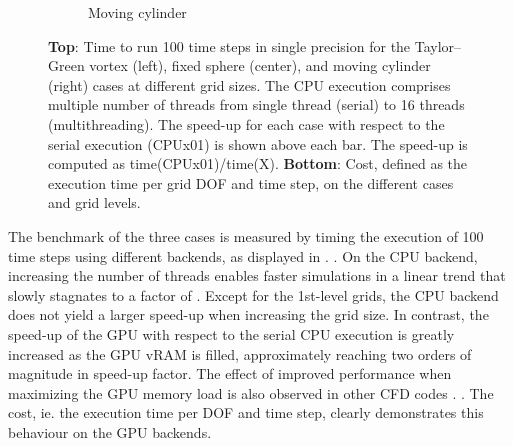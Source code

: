 \documentclass[10pt,a4paper]{article}
\begin{document}
\begin{figure}[!t]
\begin{subfigure}[t]{0.32\linewidth}
    \caption{Moving cylinder\hspace*{-1em}}
  \end{subfigure}
	\caption{\textbf{Top}: Time to run 100 time steps in single precision for the Taylor--Green vortex (left), fixed sphere (center), and moving cylinder (right) cases at different grid sizes. The CPU execution comprises multiple number of threads from single thread (serial) to 16 threads (multithreading). The speed-up for each case with respect to the serial execution (CPUx01) is shown above each bar. The speed-up is computed as time(CPUx01)/time(X). \textbf{Bottom}: Cost, defined as the execution time per grid DOF and time step, on the different cases and grid levels.}
	\label{fig:benchmarks}
\end{figure}

The benchmark of the three cases is measured by timing the execution of 100 time steps using different backends, as displayed in . . On the CPU backend, increasing the number of threads enables faster simulations in a linear trend that slowly stagnates to a factor of . Except for the 1st-level grids, the CPU backend does not yield a larger speed-up when increasing the grid size. In contrast, the speed-up of the GPU with respect to the serial CPU execution is greatly increased as the GPU vRAM is filled, approximately reaching two orders of magnitude in speed-up factor. The effect of improved performance when maximizing the GPU memory load is also observed in other CFD codes \citep{Kempf2024,Gasparino2024}. . The cost, ie. the execution time per DOF and time step, clearly demonstrates this behaviour on the GPU backends. 
\end{document}
